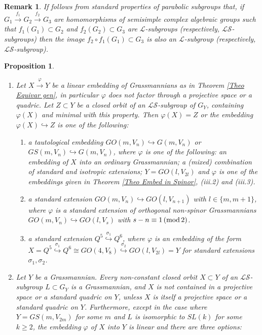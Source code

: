 \documentclass[12pt]{amsart}
\def\hw  {\hookrightarrow}
\def\mc {\mathcal}
\newtheorem{prop}[theorem]{Proposition}
\newtheorem{rem}{Remark}[section]
\begin{document}
\begin{rem}\label{Rem compose LS}
If follows from standard properties of parabolic subgroups that, if $G_1\stackrel{f_1}{\to}G_2\stackrel{f_2}{\to} G_3$ are homomorphisms of semisimple complex algebraic groups such that $f_1(G_1)\subset G_2$ and $f_2(G_2)\subset G_3$ are $\mc L$-subgroups (respectively, $\mc{LS}$-subgroups) then the image $f_2\circ f_1(G_1)\subset G_3$ is also an $\mc L$-subgroup (respectively, $\mc{LS}$-subgroup).
\end{rem}


\begin{prop}\label{Prop Equivar through LS}
$\;$
\begin{enumerate}
\item[{\rm (i)}] Let $X\stackrel{\varphi}{\to} Y$ be a linear embedding of Grassmannians as in Theorem \ref{Theo Equivar gen}, in particular $\varphi$ does not factor through a projective space or a quadric. Let $Z\subset Y$ be a closed orbit of an $\mc{LS}$-subgroup of $G_Y$, containing $\varphi(X)$ and minimal with this property. Then $\varphi(X)=Z$ or the embedding $\varphi(X)\hw Z$ is one of the following:
\begin{enumerate}
\item[{\rm (i.1)}] a tautological embedding $GO(m,V_n)\hw G(m,V_n)$ or $GS(m,V_n)\hw G(m,V_n)$, where $\varphi$ is one of the following: an embedding of $X$ into an ordinary Grassmannian; a (mixed) combination of standard and isotropic extensions; $Y=GO(l,V_{2l})$ and $\varphi$ is one of the embeddings given in Theorem \ref{Theo Embed in Spinor}, (iii.2) and (iii.3).
\item[{\rm (i.2)}] a standard extension $GO(m,V_n)\hw GO(l,V_{n+1})$ with $l\in\{m,m+1\}$, where $\varphi$ is a standard extension of orthogonal non-spinor Grassmannians $GO(m,V_n)\hw GO(l,V_{s})$ with $s-n\equiv 1\,({\rm mod}\,2)$.
\item[{\rm (i.3)}] a standard extension $Q^5\stackrel{\sigma_1}{\hw} Q^6$, where $\varphi$ is an embedding of the form $X=Q^5\stackrel{\sigma_1}{\hw} Q^6 \cong GO(4,V_8) \stackrel{\sigma_2}{\hw} GO(l,V_{2l})=Y$ for standard extensions $\sigma_1,\sigma_2$.
\end{enumerate}
\item[{\rm (ii)}] Let $Y$ be a Grassmannian. Every non-constant closed orbit $X\subset Y$ of an $\mc{LS}$-subgroup $L\subset G_Y$ is a Grassmannian, and $X$ is not contained in a projective space or a standard quadric on $Y$, unless $X$ is itself a projective space or a standard quadric on $Y$. Furthermore, except in the case where $Y= GS(m,V_{2m})$ for some $m$ and $L$ is isomorphic to $SL(k)$ for some $k\geq 2$, the embedding $\varphi$ of $X$ into $Y$ is linear and there are three options:

\end{enumerate}
\end{prop}
\end{document}
